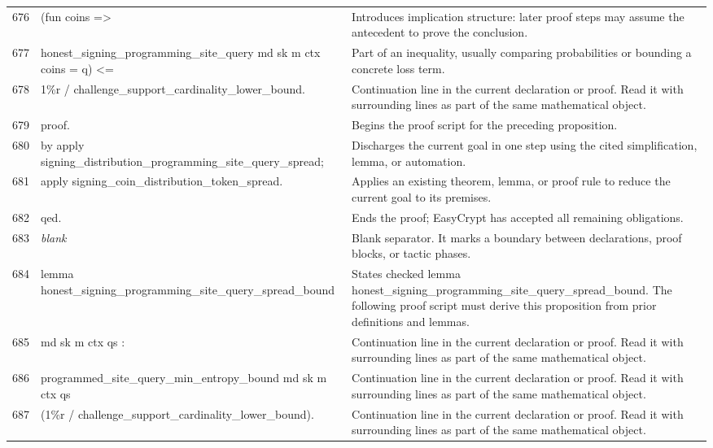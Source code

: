 \documentclass[10pt]{article}
\begin{document}
\begin{longtable}{r L{0.53\textwidth} L{0.37\textwidth}}
676 & {\ttfamily\scriptsize     (fun coins =>} & Introduces implication structure: later proof steps may assume the antecedent to prove the conclusion. \\
677 & {\ttfamily\scriptsize       honest\_signing\_programming\_site\_query md sk m ctx coins = q) <=} & Part of an inequality, usually comparing probabilities or bounding a concrete loss term. \\
678 & {\ttfamily\scriptsize   1\%r / challenge\_support\_cardinality\_lower\_bound.} & Continuation line in the current declaration or proof.  Read it with surrounding lines as part of the same mathematical object. \\
679 & {\ttfamily\scriptsize proof.} & Begins the proof script for the preceding proposition. \\
680 & {\ttfamily\scriptsize by apply signing\_distribution\_programming\_site\_query\_spread;} & Discharges the current goal in one step using the cited simplification, lemma, or automation. \\
681 & {\ttfamily\scriptsize    apply signing\_coin\_distribution\_token\_spread.} & Applies an existing theorem, lemma, or proof rule to reduce the current goal to its premises. \\
682 & {\ttfamily\scriptsize qed.} & Ends the proof; EasyCrypt has accepted all remaining obligations. \\
683 & {\ttfamily\scriptsize \emph{blank}} & Blank separator.  It marks a boundary between declarations, proof blocks, or tactic phases. \\
684 & {\ttfamily\scriptsize lemma honest\_signing\_programming\_site\_query\_spread\_bound} & States checked lemma honest\_signing\_programming\_site\_query\_spread\_bound.  The following proof script must derive this proposition from prior definitions and lemmas. \\
685 & {\ttfamily\scriptsize   md sk m ctx qs :} & Continuation line in the current declaration or proof.  Read it with surrounding lines as part of the same mathematical object. \\
686 & {\ttfamily\scriptsize   programmed\_site\_query\_min\_entropy\_bound md sk m ctx qs} & Continuation line in the current declaration or proof.  Read it with surrounding lines as part of the same mathematical object. \\
687 & {\ttfamily\scriptsize     (1\%r / challenge\_support\_cardinality\_lower\_bound).} & Continuation line in the current declaration or proof.  Read it with surrounding lines as part of the same mathematical object. \\

\end{longtable}
\end{document}
